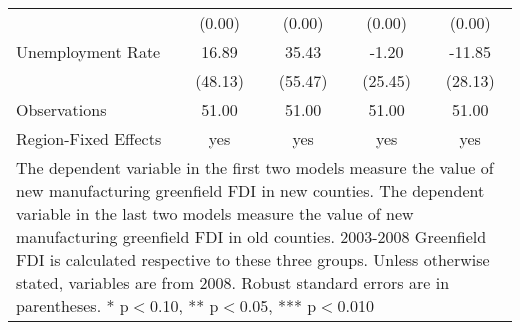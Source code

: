 \begin{table}[!htbp]
\begin{tabular}{l*{4}{c}}
                    &      (0.00)   &      (0.00)   &      (0.00)   &      (0.00)   \\
Unemployment Rate   &       16.89   &       35.43   &       -1.20   &      -11.85   \\
                    &     (48.13)   &     (55.47)   &     (25.45)   &     (28.13)   \\
\hline
Observations        &       51.00   &       51.00   &       51.00   &       51.00   \\
Region-Fixed Effects&         yes   &         yes   &         yes   &         yes   \\
\hline\hline
\multicolumn{5}{p{\linewidth}}{\footnotesize The dependent variable in the first two models measure the value of new manufacturing greenfield FDI in new counties. The dependent variable in the last two models measure the value of new manufacturing greenfield FDI in old counties. 2003-2008 Greenfield FDI is calculated respective to these three groups. Unless otherwise stated, variables are from 2008. Robust standard errors are in parentheses. * p$<$0.10, ** p$<$0.05, *** p$<$0.010}\\
\end{tabular}
\end{table}
